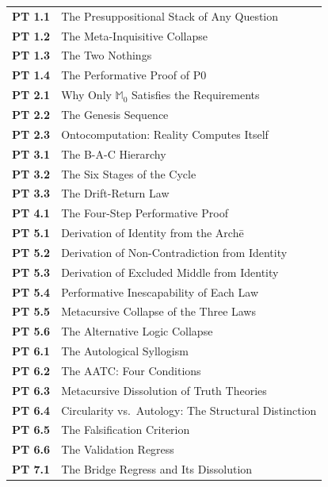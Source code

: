 \documentclass[10pt, openany, oneside]{book}
\renewcommand{\footnotesize}{\fontsize{8.5}{11}\selectfont}
\begin{document}
\vspace{1em}

{\footnotesize
\noindent\begin{tabular}{r p{}}
\textbf{PT 1.1} & The Presuppositional Stack of Any Question \\[0.2em]
\textbf{PT 1.2} & The Meta-Inquisitive Collapse \\[0.2em]
\textbf{PT 1.3} & The Two Nothings \\[0.2em]
\textbf{PT 1.4} & The Performative Proof of P0 \\[0.2em]
\textbf{PT 2.1} & Why Only $\mathbb{M}_0$ Satisfies the Requirements \\[0.2em]
\textbf{PT 2.2} & The Genesis Sequence \\[0.2em]
\textbf{PT 2.3} & Ontocomputation: Reality Computes Itself \\[0.2em]
\textbf{PT 3.1} & The B-A-C Hierarchy \\[0.2em]
\textbf{PT 3.2} & The Six Stages of the Cycle \\[0.2em]
\textbf{PT 3.3} & The Drift-Return Law \\[0.2em]
\textbf{PT 4.1} & The Four-Step Performative Proof \\[0.2em]
\textbf{PT 5.1} & Derivation of Identity from the Arch\={e} \\[0.2em]
\textbf{PT 5.2} & Derivation of Non-Contradiction from Identity \\[0.2em]
\textbf{PT 5.3} & Derivation of Excluded Middle from Identity \\[0.2em]
\textbf{PT 5.4} & Performative Inescapability of Each Law \\[0.2em]
\textbf{PT 5.5} & Metacursive Collapse of the Three Laws \\[0.2em]
\textbf{PT 5.6} & The Alternative Logic Collapse \\[0.2em]
\textbf{PT 6.1} & The Autological Syllogism \\[0.2em]
\textbf{PT 6.2} & The AATC: Four Conditions \\[0.2em]
\textbf{PT 6.3} & Metacursive Dissolution of Truth Theories \\[0.2em]
\textbf{PT 6.4} & Circularity vs.\ Autology: The Structural Distinction \\[0.2em]
\textbf{PT 6.5} & The Falsification Criterion \\[0.2em]
\textbf{PT 6.6} & The Validation Regress \\[0.2em]
\textbf{PT 7.1} & The Bridge Regress and Its Dissolution \\[0.2em]

\end{tabular}}
\end{document}
